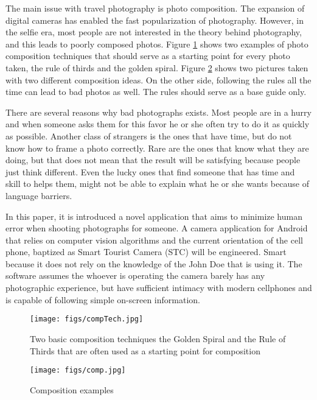 \documentclass[12pt]{article}
\begin{document}
The main issue with travel photography is photo composition. The expansion of digital cameras has enabled the fast popularization of photography. However, in the selfie era, most people are not interested in the theory behind photography, and this leads to poorly composed photos. Figure \ref{fig:compTechniques} shows two examples of photo composition techniques that should serve as a starting point for every photo taken, the rule of thirds and the golden spiral. Figure \ref{fig:compExamples} shows two pictures taken with two different composition ideas. On the other side, following the rules all the time can lead to bad photos as well. The rules should serve as a base guide only.

There are several reasons why bad photographs exists. Most people are in a hurry and when someone asks them for this favor he or she often try to do it as quickly as possible. Another class of strangers is the ones that have time, but do not know how to frame a photo correctly. Rare are the ones that know what they are doing, but that does not mean that the result will be satisfying because people just think different. Even the lucky ones that find someone that has time and skill to helps them, might not be able to explain what he or she wants because of language barriers.

In this paper, it is introduced a novel application that aims to minimize human error when shooting photographs for someone. A camera application for Android that relies on computer vision algorithms and the current orientation of the cell phone, baptized as Smart Tourist Camera (STC) will be engineered. Smart because it does not rely on the knowledge of the John Doe that is using it. The software assumes the whoever is operating the camera barely has any photographic experience, but have sufficient intimacy with modern cellphones and is capable of following simple on-screen information.


\begin{figure}[ht]
  \centering
  \texttt{[image: figs/compTech.jpg]}
  \caption{Two basic composition techniques the Golden Spiral and the Rule of Thirds that are often used as a starting point for composition}
  \label{fig:compTechniques}
\end{figure}

\begin{figure}[ht]
  \centering
  \texttt{[image: figs/comp.jpg]}
  \caption{Composition examples}
  \label{fig:compExamples}
\end{figure}
\end{document}
